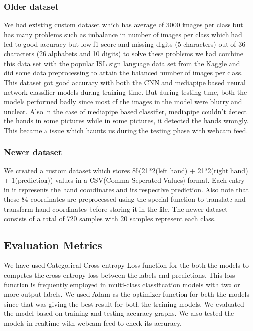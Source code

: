 \documentclass[12pt,a4paper]{report}
\begin{document}
\subsubsection{Older dataset}
We had existing custom dataset which has average of 3000 images per class but has many problems such as imbalance in number of images per class which had led to good accuracy but low f1 score and missing digits (5 characters) out of 36 characters (26 alphabets and 10 digits) to solve these problems we had combine this data set with the popular ISL sign language data set from the Kaggle and did some data preprocessing to attain the balanced number of images per class. This dataset got good accuracy with both the CNN and mediapipe based neural network classifier models during training time. But during testing time, both the models performed badly since most of the images in the model were blurry and unclear. Also in the case of mediapipe based classifier, mediapipe couldn't detect the hands in some pictures while in some pictures, it detected the hands wrongly. This became a issue which haunts us during the testing phase with webcam feed.

\subsubsection{Newer dataset}
We created a custom dataset which stores 85(21*2(left hand) + 21*2(right hand) + 1(prediction)) values in a CSV(Comma Seperated Values) format. Each entry in it represents the hand coordinates and its respective prediction. Also note that these 84 coordinates are preprocessed using the special function to translate and transform hand coordinates before storing it in the file. The newer dataset consists of a total of 720 samples with 20 samples represent each class.

\subsection{Evaluation Metrics}
We have used Categorical Cross entropy Loss function for the both the models to computes the cross-entropy loss between the labels and predictions. This loss function is frequently employed in multi-class classification models with two or more output labels. We used Adam as the optimizer function for both the models since that was giving the best result for both the training models. We evaluated the model based on training and testing accuracy graphs. We also tested the models in realtime with webcam feed to check its accuracy.
\end{document}
